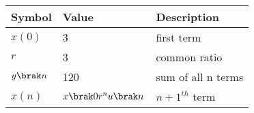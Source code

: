 \begin{tabular}{ | m{1.0cm} | m{1cm} |m{3cm} |} 
  \hline
 Symbol & Value &Description\\ 
 \hline
$x(0)$& 3 &first term \\
\hline
$r$& 3&common ratio   \\
\hline
$y\brak n$&120& sum of all n terms \\
\hline
$x(n)$& $ x \brak 0r^{n} u\brak n$&${n+1}^{th}$ term\\
\hline
\end{tabular}\\
\caption{}